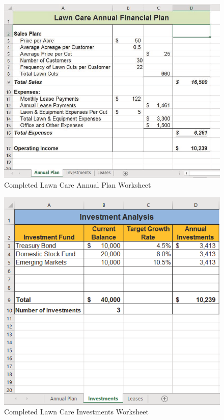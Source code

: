 \begin{figure}[H]
	\centering
	\includegraphics[width=\maxwidth{.95\linewidth}]{gfx/ch02_fig47}
	\caption{Completed Lawn Care Annual Plan Worksheet}
	\label{02:fig47}
\end{figure}

\begin{figure}[H]
	\centering
	\includegraphics[width=\maxwidth{.95\linewidth}]{gfx/ch02_fig48}
	\caption{Completed Lawn Care Investments Worksheet}
	\label{02:fig48}
\end{figure}

